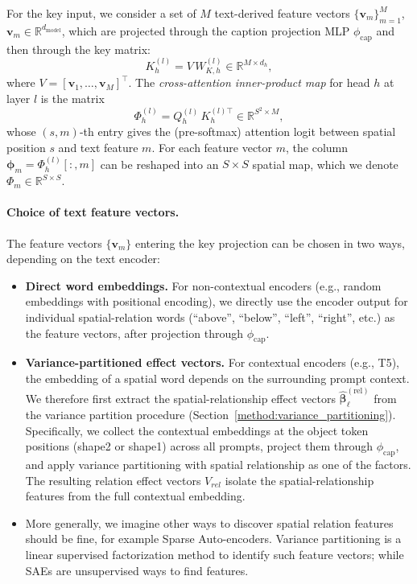 For the key input, we consider a set of $M$ text-derived feature vectors $\{\mathbf{v}_m\}_{m=1}^M$, $\mathbf{v}_m \in \mathbb{R}^{d_{\mathrm{model}}}$, which are projected through the caption projection MLP $\phi_{\mathrm{cap}}$ and then through the key matrix:
\begin{equation}
    K_h^{(l)} = V \, W_{K,h}^{(l)} \in \mathbb{R}^{M \times d_h},
\end{equation}
where $V = [\mathbf{v}_1, \dots, \mathbf{v}_M]^\top$. The \emph{cross-attention inner-product map} for head $h$ at layer $l$ is the matrix
\begin{equation}
    \Phi_h^{(l)} = Q_h^{(l)} \, K_h^{(l)\top} \in \mathbb{R}^{S^2 \times M},
    \label{eq:inner-product-map}
\end{equation}
whose $(s, m)$-th entry gives the (pre-softmax) attention logit between spatial position $s$ and text feature $m$. For each feature vector $m$, the column $\boldsymbol{\phi}_m = \Phi_h^{(l)}[:,m]$ can be reshaped into an $S \times S$ spatial map, which we denote $\Phi_m \in \mathbb{R}^{S \times S}$.

\paragraph{Choice of text feature vectors.}
The feature vectors $\{\mathbf{v}_m\}$ entering the key projection can be chosen in two ways, depending on the text encoder:

\begin{itemize}
    \item \textbf{Direct word embeddings.} For non-contextual encoders (e.g., random embeddings with positional encoding), we directly use the encoder output for individual spatial-relation words (``above'', ``below'', ``left'', ``right'', etc.) as the feature vectors, after projection through $\phi_{\mathrm{cap}}$.

    \item \textbf{Variance-partitioned effect vectors.} For contextual encoders (e.g., T5), the embedding of a spatial word depends on the surrounding prompt context. We therefore first extract the spatial-relationship effect vectors $\hat{\boldsymbol{\beta}}^{(\mathrm{rel})}_\ell$ from the variance partition procedure (Section~\ref{method:variance_partitioning}). Specifically, we collect the contextual embeddings at the object token positions (shape2 or shape1) across all prompts, project them through $\phi_{\mathrm{cap}}$, and apply variance partitioning with spatial relationship as one of the factors. The resulting relation effect vectors $V_{rel}$ isolate the spatial-relationship features from the full contextual embedding.
    \item More generally, we imagine other ways to discover spatial relation features should be fine, for example Sparse Auto-encoders. Variance partitioning is a linear supervised factorization method to identify such feature vectors; while SAEs are unsupervised ways to find features. 
\end{itemize}

